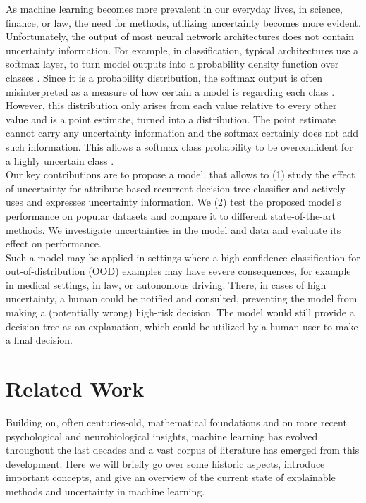 \documentclass[a4paper,cleardoubleempty,BCOR1cm, 11pt]{report}
\begin{document}
As machine learning becomes more prevalent in our everyday lives, in science, finance, or law, the need for methods, utilizing uncertainty becomes more evident.\\
Unfortunately, the output of most neural network architectures does not contain uncertainty information. For example, in classification, typical architectures use a softmax layer, to turn model outputs into a probability density function over classes \cite{nwankpa2018activation}. Since it is a probability distribution, the softmax output is often misinterpreted as a measure of how certain a model is regarding each class \cite{sensoy2018evidential}. However, this distribution only arises from each value relative to every other value and is a point estimate, turned into a distribution. The point estimate cannot carry any uncertainty information and the softmax certainly does not add such information. This allows a softmax class probability to be overconfident for a highly uncertain class \cite{gal2016dropout}.\\
Our key contributions are to propose a model, that allows to (1) study the effect of uncertainty for attribute-based recurrent decision tree classifier and actively uses and expresses uncertainty information. We (2) test the proposed model's performance on popular datasets and compare it to different state-of-the-art methods. We investigate uncertainties in the model and data and evaluate its effect on performance. \\
Such a model may be applied in settings where a high confidence classification for out-of-distribution (OOD) examples may have severe consequences, for example in medical settings, in law, or autonomous driving. There, in cases of high uncertainty, a human could be notified and consulted, preventing the model from making a (potentially wrong) high-risk decision. The model would still provide a decision tree as an explanation, which could be utilized by a human user to make a final decision.




\chapter{Related Work}
Building on, often centuries-old, mathematical foundations and on more recent psychological and neurobiological insights, machine learning has evolved throughout the last decades and a vast corpus of literature has emerged from this development. Here we will briefly go over some historic aspects, introduce important concepts, and give an overview of the current state of explainable methods and uncertainty in machine learning. 
\end{document}
